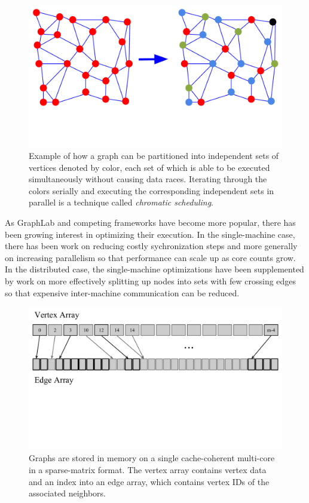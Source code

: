\begin{figure}[h]
\centering
\includegraphics[width=5in,clip,trim=0 3cm 0 0]{chromatic_scheduling.pdf}
\caption{Example of how a graph can be partitioned into 
independent sets of vertices denoted by color, each set of which is able to
be executed simultaneously without causing data races.  Iterating
through the colors serially and executing the corresponding
independent sets in parallel is a technique called \emph{chromatic scheduling}.}
\label{fig:}
\end{figure}

As GraphLab and competing frameworks have become more popular, 
there has been growing interest in optimizing their execution. 
In the single-machine case, there has been work on reducing 
costly sychronization steps and more generally on increasing 
parallelism so that performance can scale up as core counts 
grow. In the distributed case, the single-machine optimizations 
have been supplemented by work on more effectively splitting up 
nodes into sets with few crossing edges so that expensive 
inter-machine communication can be reduced.

\begin{figure}[h]
\centering
\includegraphics[keepaspectratio,width=4.5in,clip,trim=0 5cm 0 0]{sparse_matrix_representation.pdf}
\caption{Graphs are stored in memory on a single cache-coherent
multi-core in a sparse-matrix format.  The vertex array contains
vertex data and an index into an edge array, which contains vertex
IDs of the associated neighbors.}
\label{fig_layout}
\end{figure}



